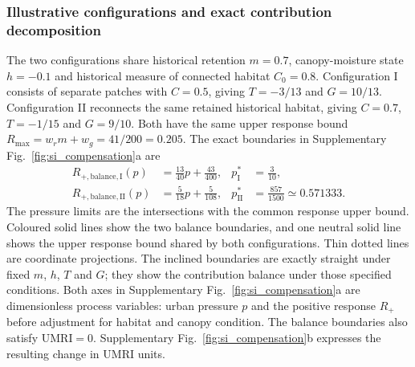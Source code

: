 \subsubsection{Illustrative configurations and exact contribution decomposition}

\begingroup
\setlength{\abovedisplayskip}{5pt plus 1pt minus 1pt}
\setlength{\belowdisplayskip}{5pt plus 1pt minus 1pt}
\setlength{\abovedisplayshortskip}{3pt}
\setlength{\belowdisplayshortskip}{4pt}
\setlength{\parskip}{2pt}

The two configurations share historical retention $m=0.7$, canopy-moisture state $h=-0.1$ and historical measure of connected habitat $C_0=0.8$. Configuration I consists of separate patches with $C=0.5$, giving $T=-3/13$ and $G=10/13$. Configuration II reconnects the same retained historical habitat, giving $C=0.7$, $T=-1/15$ and $G=9/10$. Both have the same upper response bound $R_{\max}=w_rm+w_g=41/200=0.205$. The exact boundaries in Supplementary Fig.~\ref{fig:si_compensation}a are
\[
\begin{aligned}
R_{+,\mathrm{balance,I}}(p)&=\frac{13}{40}p+\frac{43}{400},
&p_{\mathrm I}^*&=\frac3{10},\\
R_{+,\mathrm{balance,II}}(p)&=\frac5{18}p+\frac5{108},
&p_{\mathrm{II}}^*&=\frac{857}{1500}\simeq0.571333.
\end{aligned}
\]
The pressure limits are the intersections with the common response upper bound. Coloured solid lines show the two balance boundaries, and one neutral solid line shows the upper response bound shared by both configurations. Thin dotted lines are coordinate projections. The inclined boundaries are exactly straight under fixed $m$, $h$, $T$ and $G$; they show the contribution balance under those specified conditions. Both axes in Supplementary Fig.~\ref{fig:si_compensation}a are dimensionless process variables: urban pressure $p$ and the positive response $R_+$ before adjustment for habitat and canopy condition. The balance boundaries also satisfy $\mathrm{UMRI}=0$. Supplementary Fig.~\ref{fig:si_compensation}b expresses the resulting change in UMRI units.

